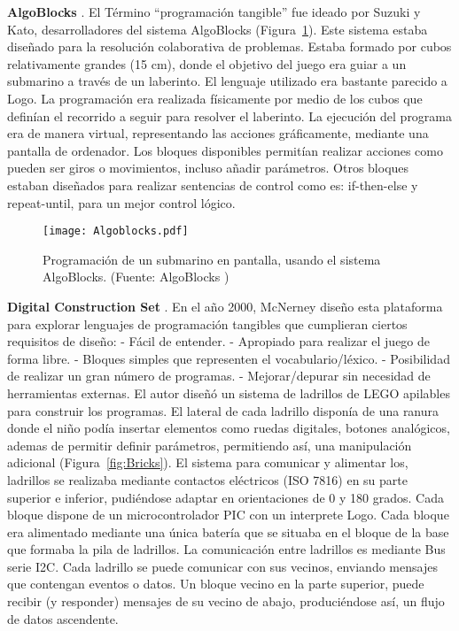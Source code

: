 \textbf{AlgoBlocks} \cite{Suzuki}. El Término “programación tangible” fue ideado por Suzuki y Kato, desarrolladores del sistema AlgoBlocks (Figura~\ref{fig:Algoblocks}). Este sistema estaba diseñado para la resolución colaborativa de problemas. Estaba formado por cubos relativamente grandes (15 cm), donde el objetivo del juego era guiar a un submarino a través de un laberinto. El lenguaje utilizado era bastante parecido a Logo. La programación era realizada físicamente por medio de los cubos que definían el recorrido a seguir para resolver el laberinto. La ejecución del programa era de manera virtual, representando las acciones gráficamente, mediante una pantalla de ordenador. Los bloques disponibles permitían realizar acciones como pueden ser giros o movimientos, incluso añadir parámetros. Otros bloques estaban diseñados para realizar sentencias de control como es: if-then-else y repeat-until, para un mejor control lógico. 


\begin{figure}[!h]
\begin{center}
\texttt{[image: Algoblocks.pdf]}
\caption{Programación de un submarino en pantalla, usando el sistema AlgoBlocks. (Fuente: AlgoBlocks \cite{Suzuki})}
\label{fig:Algoblocks}
\end{center}
\end{figure}

\textbf{Digital Construction Set} \cite{McNerneyBricks}. En el año 2000, McNerney diseño esta plataforma para explorar lenguajes de programación tangibles que cumplieran ciertos requisitos de diseño: 
- Fácil de entender.
- Apropiado para realizar el juego de forma libre.
- Bloques simples que representen el vocabulario/léxico.
- Posibilidad de realizar un gran número de programas.
- Mejorar/depurar sin necesidad de herramientas externas.
El autor diseñó un sistema de ladrillos de LEGO apilables para construir los programas. El lateral de cada ladrillo disponía de una ranura donde el niño podía insertar elementos como ruedas digitales, botones analógicos, ademas de permitir definir parámetros, permitiendo así, una manipulación adicional (Figura~\ref{fig:Bricks}).
El sistema para comunicar y alimentar los, ladrillos se realizaba mediante contactos eléctricos (ISO 7816) en su parte superior e inferior, pudiéndose adaptar en orientaciones de 0 y 180 grados.
Cada bloque dispone de un microcontrolador PIC con un interprete Logo. Cada bloque era alimentado mediante una única batería que se situaba en el bloque de la base que formaba la pila de ladrillos. La comunicación entre ladrillos es mediante Bus serie I2C. 
Cada ladrillo se puede comunicar con sus vecinos, enviando mensajes que contengan eventos o datos. Un bloque vecino en la parte superior, puede recibir (y responder) mensajes de su vecino de abajo, produciéndose así, un flujo de datos ascendente.

